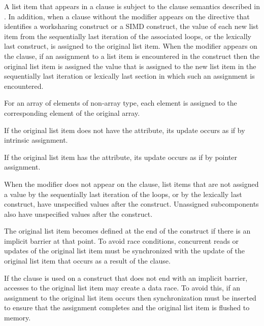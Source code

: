 {{{{A list item that appears in a  clause is subject to the  clause 
semantics described in 
. 
In addition, when a 
 clause without the  modifier appears on the directive that identifies a worksharing construct 
or a SIMD construct, the value of each new list item from the sequentially last iteration 
of the associated loops, or the lexically last  construct, is assigned to the 
original list item. When the  modifier appears on the clause,
if an assignment to a list item is encountered in the construct then the
original list item is assigned the value that is assigned to the new list item
in the sequentially last iteration or lexically last section in which such an
assignment is encountered.


\ccppspecificstart
For an array of elements of non-array type, each element is assigned to the 
corresponding element of the original array.
\ccppspecificend
\bigskip

\fortranspecificstart
If the original list item does not have the  attribute, its update occurs as if by 
intrinsic assignment.

\pagebreak

If the original list item has the  attribute, its update occurs as if by pointer 
assignment.
\fortranspecificend

When the  modifier does not appear on the  clause, list items that are not
assigned a value by the sequentially last iteration of the loops, or by the
lexically last  construct, have unspecified values after the
construct.  Unassigned subcomponents also have unspecified values after the
construct.

The original list item becomes defined at the end of the construct if there is an implicit 
barrier at that point. To avoid race conditions, concurrent reads or updates of the original 
list item must be synchronized with the update of the original list item that occurs as a 
result of the  clause.

If the  clause is used on a construct that does not end with
an implicit barrier, accesses to the original list item may create a data race.
To avoid this, if an assignment to the original list item occurs
then synchronization must be inserted to ensure that the assignment completes and
the original list item is flushed to memory.

}}}}

